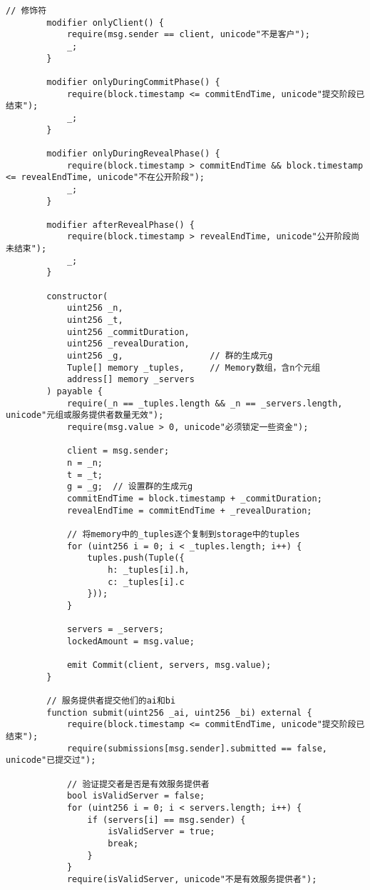 \begin{lstlisting}[language=Solidity]
        // 修饰符
        modifier onlyClient() {
            require(msg.sender == client, unicode"不是客户");
            _;
        }
    
        modifier onlyDuringCommitPhase() {
            require(block.timestamp <= commitEndTime, unicode"提交阶段已结束");
            _;
        }
    
        modifier onlyDuringRevealPhase() {
            require(block.timestamp > commitEndTime && block.timestamp <= revealEndTime, unicode"不在公开阶段");
            _;
        }
    
        modifier afterRevealPhase() {
            require(block.timestamp > revealEndTime, unicode"公开阶段尚未结束");
            _;
        }
    
        constructor(
            uint256 _n,
            uint256 _t,
            uint256 _commitDuration,
            uint256 _revealDuration,
            uint256 _g,                 // 群的生成元g
            Tuple[] memory _tuples,     // Memory数组，含n个元组
            address[] memory _servers
        ) payable {
            require(_n == _tuples.length && _n == _servers.length, unicode"元组或服务提供者数量无效");
            require(msg.value > 0, unicode"必须锁定一些资金");
    
            client = msg.sender;
            n = _n;
            t = _t;
            g = _g;  // 设置群的生成元g
            commitEndTime = block.timestamp + _commitDuration;
            revealEndTime = commitEndTime + _revealDuration;
            
            // 将memory中的_tuples逐个复制到storage中的tuples
            for (uint256 i = 0; i < _tuples.length; i++) {
                tuples.push(Tuple({
                    h: _tuples[i].h,
                    c: _tuples[i].c
                }));
            }
    
            servers = _servers;
            lockedAmount = msg.value;
    
            emit Commit(client, servers, msg.value);
        }
    
        // 服务提供者提交他们的ai和bi
        function submit(uint256 _ai, uint256 _bi) external {
            require(block.timestamp <= commitEndTime, unicode"提交阶段已结束");
            require(submissions[msg.sender].submitted == false, unicode"已提交过");
    
            // 验证提交者是否是有效服务提供者
            bool isValidServer = false;
            for (uint256 i = 0; i < servers.length; i++) {
                if (servers[i] == msg.sender) {
                    isValidServer = true;
                    break;
                }
            }
            require(isValidServer, unicode"不是有效服务提供者");
    

\end{lstlisting}
